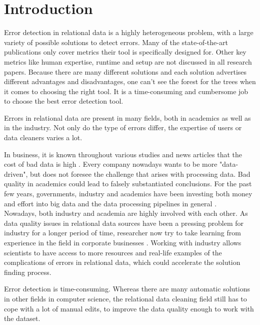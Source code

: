 
\section{Introduction}

Error detection in relational data is a highly heterogeneous problem, with a large variety of possible solutions to detect errors. Many of the state-of-the-art publications only cover metrics their tool is specifically designed for. Other key metrics like human expertise, runtime and setup are not discussed in all research papers. Because there are many different solutions and each solution advertises different advantages and disadvantages, one can't see the forest for the trees when it comes to choosing the right tool. It is a time-consuming and cumbersome job to choose the best error detection tool.

Errors in relational data are present in many fields, both in academics as well as in the industry. Not only do the type of errors differ, the expertise of users or data cleaners varies a lot. 

In business, it is known throughout various studies and news articles that the cost of bad data is high \cite{Ilyas2015-oh}. Every company nowadays wants to be more "data-driven", but does not foresee the challenge that arises with processing data. Bad quality in academics could lead to falsely substantiated conclusions. For the past few years, governments, industry and academics have been investing both money and effort into big data and the data processing pipelines in general \cite{Cai2015-hr}. \\Nowadays, both industry and academia are highly involved with each other. As data quality issues in relational data sources have been a pressing problem for industry for a longer period of time, researcher now try to take learning from experience in the field in corporate businesses \cite{Stonebraker2018-ag}. Working with industry allows scientists to have access to more resources and real-life examples of the complications of errors in relational data, which could accelerate the solution finding process.

Error detection is time-consuming. Whereas there are many automatic solutions in other fields in computer science, the relational data cleaning field still has to cope with a lot of manual edits, to improve the data quality enough to work with the dataset.

